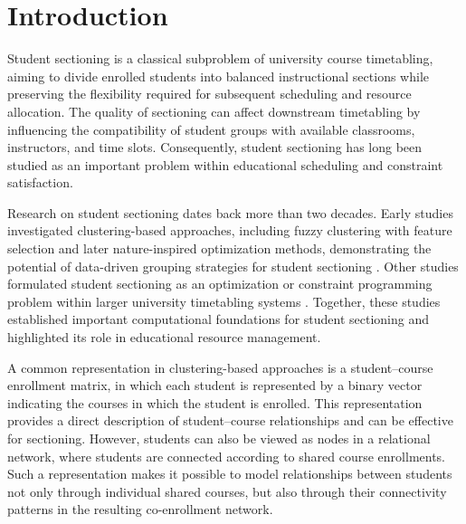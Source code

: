 \documentclass[pdflatex,sn-mathphys-num,iicol]{sn-jnl}%
\theoremstyle{thmstyleone}%
\theoremstyle{thmstyletwo}%
\theoremstyle{thmstylethree}%
\begin{document}



\maketitle

\clearpage

\section{Introduction}

Student sectioning is a classical subproblem of university course timetabling, aiming to divide enrolled students into balanced instructional sections while preserving the flexibility required for subsequent scheduling and resource allocation. The quality of sectioning can affect downstream timetabling by influencing the compatibility of student groups with available classrooms, instructors, and time slots. Consequently, student sectioning has long been studied as an important problem within educational scheduling and constraint satisfaction.

Research on student sectioning dates back more than two decades. Early studies investigated clustering-based approaches, including fuzzy clustering with feature selection and later nature-inspired optimization methods, demonstrating the potential of data-driven grouping strategies for student sectioning \cite{Amintoosi2005Feature,Amintoosi2007FishSchool}. Other studies formulated student sectioning as an optimization or constraint programming problem within larger university timetabling systems \cite{aubin1989large,hertz1998constructing,Carter2001Comprehensive,Alvarez-Valdes2000,Muller2010}. Together, these studies established important computational foundations for student sectioning and highlighted its role in educational resource management.

A common representation in clustering-based approaches is a student--course enrollment matrix, in which each student is represented by a binary vector indicating the courses in which the student is enrolled. This representation provides a direct description of student--course relationships and can be effective for sectioning. However, students can also be viewed as nodes in a relational network, where students are connected according to shared course enrollments. Such a representation makes it possible to model relationships between students not only through individual shared courses, but also through their connectivity patterns in the resulting co-enrollment network.
\end{document}

